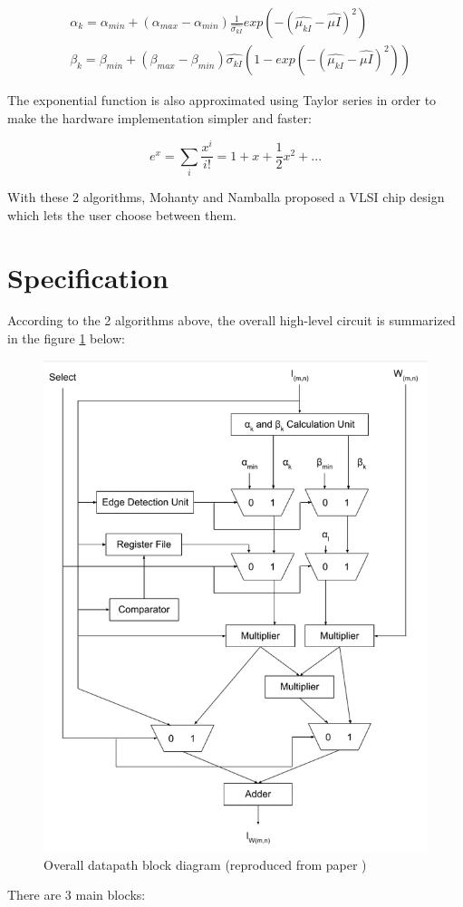 \documentclass[letterpaper, 11pt]{article}
\begin{document}
	\begin{equation}
		\label{eq6}
		\begin{aligned}
			& \alpha_k = \alpha_{min} + (\alpha_{max} - \alpha_{min})\frac{1}{\hat{\sigma_{kI}}} exp(-(\hat{\mu_{kI}} - \hat{\mu{I}})^2) \\
			& \beta_k = \beta_{min} + (\beta_{max} - \beta_{min})\hat{\sigma_{kI}} (1 - exp(-(\hat{\mu_{kI}} - \hat{\mu{I}})^2))
		\end{aligned}
	\end{equation}
	
	The exponential function is also approximated using Taylor series in order to make the hardware implementation simpler and faster:
	
	\begin{equation}
		\label{eq7}
		e^x = \sum_{i}\frac{x^i}{i!} = 1 + x + \frac{1}{2}x^2 + ...
	\end{equation}
	
	With these 2 algorithms, Mohanty and Namballa \cite{1} proposed a VLSI chip design which lets the user choose between them.
	
	\section{Specification}
	\label{sec:specs}
	
	According to the 2 algorithms above, the overall high-level circuit is summarized in the figure \ref{fig1} below:
	
	\begin{figure}[htb!]
		\centering
		\includegraphics[width=0.4\linewidth]{report_pics/overall_block_diagram.png}
		\caption{Overall datapath block diagram (reproduced from paper \cite{1})}
		\label{fig1}
	\end{figure}
	
	There are 3 main blocks:
	
\end{document}
